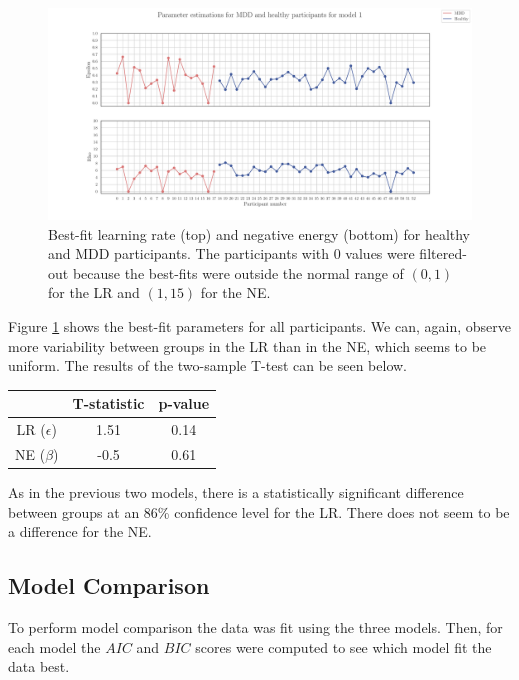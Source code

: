 \documentclass[12pt]{article}
\begin{document}
\begin{figure}[h!]
	\centering
	\hspace*{-0.6in}
	\includegraphics[width=1.1\linewidth]{figures/2.6.1.pdf}
	\caption{Best-fit learning rate (top) and negative energy (bottom) for healthy and MDD participants. The participants with 0 values were filtered-out because the best-fits were outside the normal range of $(0,1)$ for the LR and $(1, 15)$ for the NE.}
	\label{fig:2.6.2}
\end{figure}

Figure \ref{fig:2.6.2} shows the best-fit parameters for all participants. We can, again, observe more variability between groups in the LR than in the NE, which seems to be uniform. The results of the two-sample T-test can be seen below.

\begin{center}
 \begin{tabular}{|c || c | c |} 
 \hline
  & T-statistic & p-value  \\ [0.5ex] 
 \hline\hline
 LR ($\epsilon$) & 1.51 & 0.14 \\
 \hline
 NE ($\beta$) & -0.5 & 0.61 \\ [1ex] 
 \hline
\end{tabular}
\end{center}

As in the previous two models, there is a statistically significant difference between groups at an 86\% confidence level for the LR. There does not seem to be a difference for the NE.

\subsection{Model Comparison}

To perform model comparison the data was fit using the three models. Then, for each model the $AIC$ and $BIC$ scores were computed to see which model fit the data best. 
\end{document}
